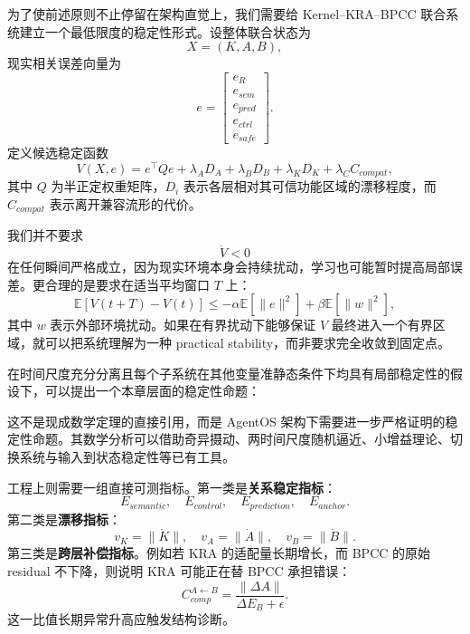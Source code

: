为了使前述原则不止停留在架构直觉上，我们需要给 Kernel--KRA--BPCC 联合系统建立一个最低限度的稳定性形式。设整体联合状态为
\[
X
=
(K,A,B),
\]
现实相关误差向量为
\[
e
=
\begin{bmatrix}
e_R\\
e_{sem}\\
e_{pred}\\
e_{ctrl}\\
e_{safe}
\end{bmatrix}.
\]
定义候选稳定函数
\[
V(X,e)
=
e^\top Q e
+
\lambda_A D_A
+
\lambda_B D_B
+
\lambda_K D_K
+
\lambda_C C_{compat},
\]
其中 $Q$ 为半正定权重矩阵，$D_i$ 表示各层相对其可信功能区域的漂移程度，而 $C_{compat}$ 表示离开兼容流形的代价。

我们并不要求
\[
\dot V<0
\]
在任何瞬间严格成立，因为现实环境本身会持续扰动，学习也可能暂时提高局部误差。更合理的是要求在适当平均窗口 $T$ 上：
\[
\boxed{
\mathbb E
\left[
V(t+T)-V(t)
\right]
\leq
-\alpha
\mathbb E
\left[
\|e\|^2
\right]
+
\beta
\mathbb E
\left[
\|w\|^2
\right],
}
\]
其中 $w$ 表示外部环境扰动。如果在有界扰动下能够保证 $V$ 最终进入一个有界区域，就可以把系统理解为一种 practical stability，而非要求完全收敛到固定点。

在时间尺度充分分离且每个子系统在其他变量准静态条件下均具有局部稳定性的假设下，可以提出一个本章层面的稳定性命题：

\begin{statementbox}
\centering
{}
\end{statementbox}

这不是现成数学定理的直接引用，而是 AgentOS 架构下需要进一步严格证明的稳定性命题。其数学分析可以借助奇异摄动、两时间尺度随机逼近、小增益理论、切换系统与输入到状态稳定性等已有工具。

工程上则需要一组直接可测指标。第一类是\textbf{关系稳定指标}：
\[
E_{semantic},
\quad
E_{control},
\quad
E_{prediction},
\quad
E_{anchor}.
\]
第二类是\textbf{漂移指标}：
\[
v_K=\|\dot K\|,
\quad
v_A=\|\dot A\|,
\quad
v_B=\|\dot B\|.
\]
第三类是\textbf{跨层补偿指标}。例如若 KRA 的适配量长期增长，而 BPCC 的原始 residual 不下降，则说明 KRA 可能正在替 BPCC 承担错误：
\[
C_{comp}^{A\leftarrow B}
=
\frac{
\|\Delta A\|
}{
\Delta E_B+\epsilon
}.
\]
这一比值长期异常升高应触发结构诊断。

